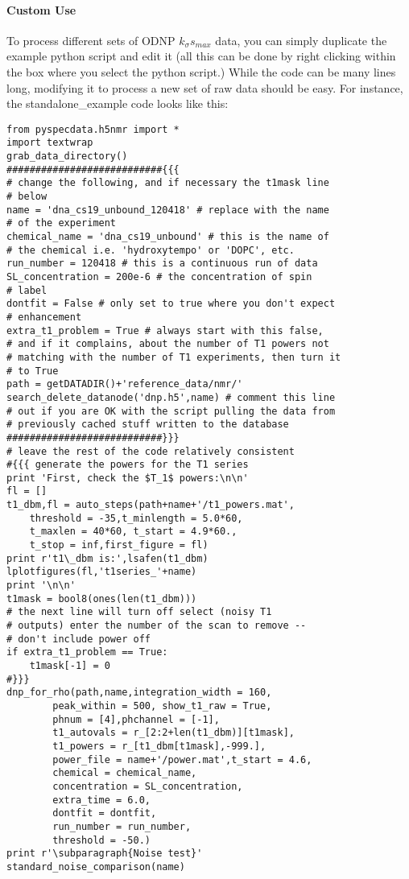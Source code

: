 \paragraph{Custom Use}
To process different sets of ODNP $k_\sigma s_{max}$ data,
    you can simply duplicate the example python script
    and edit it
    (all this can be done by right clicking
    within the box where you select the python script.)
While the code can be many lines long,
    modifying it to process a new set of raw data should be easy.
For instance, the standalone\_example code looks like this:\\ 
    \begin{lstlisting}
from pyspecdata.h5nmr import *
import textwrap
grab_data_directory()
###########################{{{
# change the following, and if necessary the t1mask line
# below
name = 'dna_cs19_unbound_120418' # replace with the name
# of the experiment
chemical_name = 'dna_cs19_unbound' # this is the name of
# the chemical i.e. 'hydroxytempo' or 'DOPC', etc.
run_number = 120418 # this is a continuous run of data
SL_concentration = 200e-6 # the concentration of spin
# label
dontfit = False # only set to true where you don't expect
# enhancement
extra_t1_problem = True # always start with this false,
# and if it complains, about the number of T1 powers not
# matching with the number of T1 experiments, then turn it
# to True
path = getDATADIR()+'reference_data/nmr/'
search_delete_datanode('dnp.h5',name) # comment this line
# out if you are OK with the script pulling the data from
# previously cached stuff written to the database
###########################}}}
# leave the rest of the code relatively consistent
#{{{ generate the powers for the T1 series
print 'First, check the $T_1$ powers:\n\n'
fl = []
t1_dbm,fl = auto_steps(path+name+'/t1_powers.mat',
    threshold = -35,t_minlength = 5.0*60,
    t_maxlen = 40*60, t_start = 4.9*60.,
    t_stop = inf,first_figure = fl)
print r't1\_dbm is:',lsafen(t1_dbm)
lplotfigures(fl,'t1series_'+name)
print '\n\n'
t1mask = bool8(ones(len(t1_dbm)))
# the next line will turn off select (noisy T1
# outputs) enter the number of the scan to remove --
# don't include power off
if extra_t1_problem == True:
    t1mask[-1] = 0
#}}}
dnp_for_rho(path,name,integration_width = 160,
        peak_within = 500, show_t1_raw = True,
        phnum = [4],phchannel = [-1],
        t1_autovals = r_[2:2+len(t1_dbm)][t1mask],
        t1_powers = r_[t1_dbm[t1mask],-999.],
        power_file = name+'/power.mat',t_start = 4.6,
        chemical = chemical_name,
        concentration = SL_concentration,
        extra_time = 6.0,
        dontfit = dontfit,
        run_number = run_number,
        threshold = -50.)
print r'\subparagraph{Noise test}'
standard_noise_comparison(name)
    \end{lstlisting}
